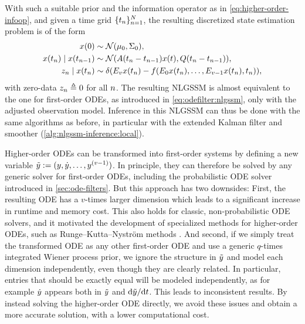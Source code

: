 \documentclass{mimosis}
\begin{document}
With such a suitable prior and the information operator as in \cref{eq:higher-order-infoop},
and given a time grid \(\{t_n\}_{n=1}^N\),
the resulting discretized state estimation problem is of the form
\begin{subequations}
\begin{align}
  \st(0) &\sim \N( \mu_0, \Sigma_0 ), \\
  \st(t_\idxt) \mid \st(t_{\idxt-1}) &\sim \N( \transA(t_\idxt - t_{\idxt-1}) \st(t), \transC(t_\idxt - t_{\idxt-1}) ), \\
  \sobs_\idxt \mid \st(t_\idxt) &\sim \dirac( \proj{v} \st(t_\idxt) - \vf(\proj{0} \st(t_\idxt), \dots, \proj{v-1} \st(t_\idxt), t_\idxt) ),
\end{align}
\end{subequations}
with
zero-data \(z_n \triangleq 0\) for all \(n\).
The resulting NLGSSM is almost equivalent to the one for first-order ODEs, as introduced in \cref{eq:odefilter:nlgssm}, only with the adjusted observation model.
Inference in this NLGSSM can thus be done with the same algorithms as before,
in particular with the extended Kalman filter and smoother
(\cref{alg:nlgssm-inference:local}).

\begin{remark}
Higher-order ODEs can be transformed into first-order systems by defining a new variable \(\tilde{y} := (y, \dot{y}, \dots, y^{(v-1)})\).
In principle, they can therefore be solved by any generic solver for first-order ODEs, including the probabilistic ODE solver introduced in \cref{sec:ode-filters}.
But this approach has two downsides:
First, the resulting ODE has a \(v\)-times larger dimension which leads to a significant increase in runtime and memory cost.
This also holds for classic, non-probabilistic ODE solvers, and it motivated the development of specialized methods for higher-order ODEs, such as Runge--Kutta--Nyström methods
\parencite{nyström1925numerische,hairer2008solving}.
And second, if we simply treat the transformed ODE as any other first-order ODE and use a generic \(q\)-times integrated Wiener process prior, we ignore the structure in \(\tilde{y}\) and model each dimension independently, even though they are clearly related.
In particular, entries that should be exactly equal will be modeled independently, as for example \(\dot{y}\) appears both in \(\tilde{y}\) and \(\dd \tilde{y} / \dd t\).
This leads to inconsistent results.
By instead solving the higher-order ODE directly, we avoid these issues and obtain a more accurate solution, with a lower computational cost.
\end{remark}
\end{document}

